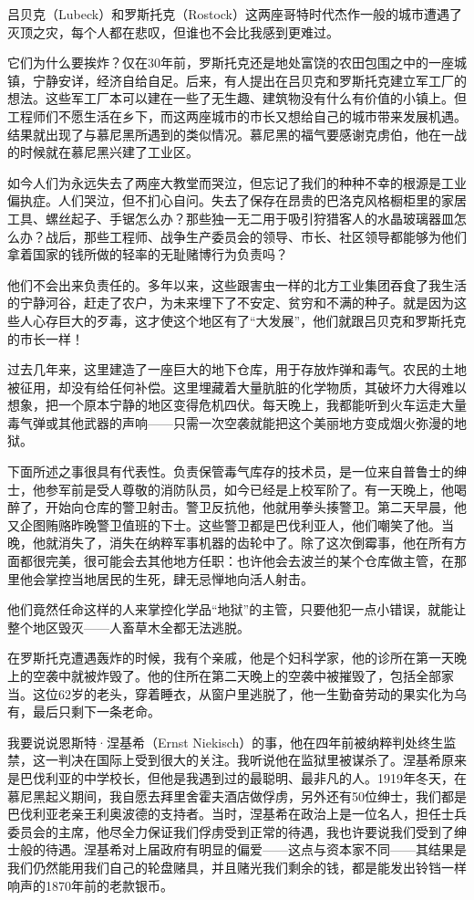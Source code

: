 \documentclass[UTF8]{ctexart}
\begin{document}
吕贝克（Lubeck）和罗斯托克（Rostock）这两座哥特时代杰作一般的城市遭遇了灭顶之灾，每个人都在悲叹，但谁也不会比我感到更难过。

它们为什么要挨炸？仅在30年前，罗斯托克还是地处富饶的农田包围之中的一座城镇，宁静安详，经济自给自足。后来，有人提出在吕贝克和罗斯托克建立军工厂的想法。这些军工厂本可以建在一些了无生趣、建筑物没有什么有价值的小镇上。但工程师们不愿生活在乡下，而这两座城市的市长又想给自己的城市带来发展机遇。结果就出现了与慕尼黑所遇到的类似情况。慕尼黑的福气要感谢克虏伯，他在一战的时候就在慕尼黑兴建了工业区。

如今人们为永远失去了两座大教堂而哭泣，但忘记了我们的种种不幸的根源是工业偏执症。人们哭泣，但不扪心自问。失去了保存在昂贵的巴洛克风格橱柜里的家居工具、螺丝起子、手锯怎么办？那些独一无二用于吸引狩猎客人的水晶玻璃器皿怎么办？战后，那些工程师、战争生产委员会的领导、市长、社区领导都能够为他们拿着国家的钱所做的轻率的无耻赌博行为负责吗？

他们不会出来负责任的。多年以来，这些跟害虫一样的北方工业集团吞食了我生活的宁静河谷，赶走了农户，为未来埋下了不安定、贫穷和不满的种子。就是因为这些人心存巨大的歹毒，这才使这个地区有了“大发展”，他们就跟吕贝克和罗斯托克的市长一样！

过去几年来，这里建造了一座巨大的地下仓库，用于存放炸弹和毒气。农民的土地被征用，却没有给任何补偿。这里埋藏着大量肮脏的化学物质，其破坏力大得难以想象，把一个原本宁静的地区变得危机四伏。每天晚上，我都能听到火车运走大量毒气弹或其他武器的声响——只需一次空袭就能把这个美丽地方变成烟火弥漫的地狱。

下面所述之事很具有代表性。负责保管毒气库存的技术员，是一位来自普鲁士的绅士，他参军前是受人尊敬的消防队员，如今已经是上校军阶了。有一天晚上，他喝醉了，开始向仓库的警卫射击。警卫反抗他，他就用拳头揍警卫。第二天早晨，他又企图贿赂昨晚警卫值班的下士。这些警卫都是巴伐利亚人，他们嘲笑了他。当晚，他就消失了，消失在纳粹军事机器的齿轮中了。除了这次倒霉事，他在所有方面都很完美，很可能会去其他地方任职：也许他会去波兰的某个仓库做主管，在那里他会掌控当地居民的生死，肆无忌惮地向活人射击。

他们竟然任命这样的人来掌控化学品“地狱”的主管，只要他犯一点小错误，就能让整个地区毁灭——人畜草木全都无法逃脱。

在罗斯托克遭遇轰炸的时候，我有个亲戚，他是个妇科学家，他的诊所在第一天晚上的空袭中就被炸毁了。他的住所在第二天晚上的空袭中被摧毁了，包括全部家当。这位62岁的老头，穿着睡衣，从窗户里逃脱了，他一生勤奋劳动的果实化为乌有，最后只剩下一条老命。

我要说说恩斯特·涅基希（Ernst Niekisch）的事，他在四年前被纳粹判处终生监禁，这一判决在国际上受到很大的关注。我听说他在监狱里被谋杀了。涅基希原来是巴伐利亚的中学校长，但他是我遇到过的最聪明、最非凡的人。1919年冬天，在慕尼黑起义期间，我自愿去拜里舍霍夫酒店做俘虏，另外还有50位绅士，我们都是巴伐利亚老亲王利奥波德的支持者。当时，涅基希在政治上是一位名人，担任士兵委员会的主席，他尽全力保证我们俘虏受到正常的待遇，我也许要说我们受到了绅士般的待遇。涅基希对上届政府有明显的偏爱——这点与资本家不同——其结果是我们仍然能用我们自己的轮盘赌具，并且赌光我们剩余的钱，都是能发出铃铛一样响声的1870年前的老款银币。
\end{document}
